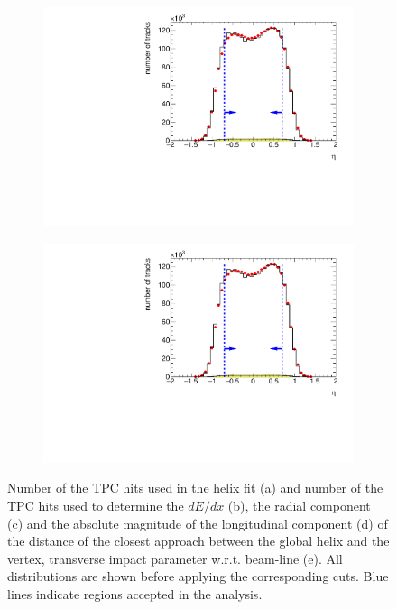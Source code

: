 \begin{figure}[b!]
\begin{subfigure}{.45\textwidth}
		\caption{}
	\end{subfigure}
	\begin{subfigure}{.45\textwidth}
		\includegraphics[width=\textwidth, page=6]{chapters/chrgSTAR/img/selection/SDT.pdf}
		\caption{}
	\end{subfigure}
	\begin{subfigure}{.45\textwidth}
		\includegraphics[width=\textwidth, page=11]{chapters/chrgSTAR/img/selection/SDT.pdf}
		\caption{}
	\end{subfigure}
	\begin{minipage}{.45\textwidth}


		\caption{Number of the  TPC hits used in the helix fit (a) and number of the  TPC hits used to determine the $dE/dx$ (b), the radial component (c) and the absolute magnitude of the longitudinal component (d) of the distance of the closest approach between  the global helix and the vertex, transverse impact parameter w.r.t. beam-line (e). All distributions are shown before applying  the corresponding cuts. Blue lines indicate regions accepted in the analysis.}
		\label{fig:dca_nhitsSTAR}
	\end{minipage}
\end{figure}

